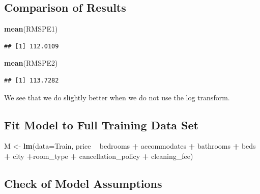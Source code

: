 \documentclass[]{book}
\newenvironment{Shaded}{\begin{snugshade}}{\end{snugshade}}
\newcommand{\KeywordTok}[1]{\textcolor[rgb]{0.13,0.29,0.53}{\textbf{#1}}}
\newcommand{\DataTypeTok}[1]{\textcolor[rgb]{0.13,0.29,0.53}{#1}}
\newcommand{\StringTok}[1]{\textcolor[rgb]{0.31,0.60,0.02}{#1}}
\newcommand{\OperatorTok}[1]{\textcolor[rgb]{0.81,0.36,0.00}{\textbf{#1}}}
\newcommand{\NormalTok}[1]{#1}
\begin{document}
\subsection{Comparison of Results}\label{comparison-of-results}

\begin{Shaded}
\begin{Highlighting}[]
\KeywordTok{mean}\NormalTok{(RMSPE1)}
\end{Highlighting}
\end{Shaded}

\begin{verbatim}
## [1] 112.0109
\end{verbatim}

\begin{Shaded}
\begin{Highlighting}[]
\KeywordTok{mean}\NormalTok{(RMSPE2)}
\end{Highlighting}
\end{Shaded}

\begin{verbatim}
## [1] 113.7282
\end{verbatim}

We see that we do slightly better when we do not use the log transform.

\subsection{Fit Model to Full Training Data
Set}\label{fit-model-to-full-training-data-set}

\begin{Shaded}
\begin{Highlighting}[]
\NormalTok{M <-}\StringTok{ }\KeywordTok{lm}\NormalTok{(}\DataTypeTok{data=}\NormalTok{Train, price }\OperatorTok{~}\StringTok{ }\NormalTok{bedrooms }\OperatorTok{+}\StringTok{ }\NormalTok{accommodates }\OperatorTok{+}\StringTok{ }\NormalTok{bathrooms }\OperatorTok{+}\StringTok{ }\NormalTok{beds }\OperatorTok{+}\StringTok{ }
\StringTok{           }\NormalTok{city }\OperatorTok{+}\NormalTok{room_type }\OperatorTok{+}\StringTok{ }\NormalTok{cancellation_policy }\OperatorTok{+}\StringTok{ }\NormalTok{cleaning_fee)}
\end{Highlighting}
\end{Shaded}

\subsection{Check of Model
Assumptions}\label{check-of-model-assumptions-1}
\end{document}

